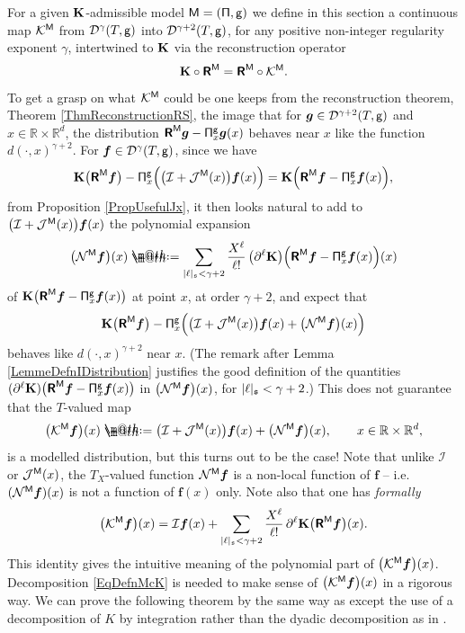 \documentclass[10pt, reqno]{amsart}
\makeatletter
\numberwithin{subsection}{section}
\numberwithin{subsubsection}{subsection}
\numberwithin{equation}{section} %
\theoremstyle{mystyle}
\theoremstyle{mystyle2}
\theoremstyle{mystyle3}
\newcommand{\bsf}{\boldsymbol{f}}
\newcommand{\bsg}{\boldsymbol{g}}
\newcommand\bbR{\mathbb{R}}
\newcommand{\mcD}{\mathcal{D}}
\newcommand{\mcI}{\mathcal{I}}
\newcommand{\mcJ}{\mathcal{J}}
\newcommand{\mcK}{\mathcal{K}}
\newcommand{\mcN}{\mathcal{N}}
\newcommand*{\defeq}{\mathrel{\rlap{%
                     \raisebox{0.3ex}{$\m@th\cdot$}}%
                     \raisebox{-0.3ex}{$\m@th\cdot$}}%
                     =}
\makeatother
\begin{document}
For a given ${\bf K}$-admissible model ${\sf M}=({\sf\Pi},{\sf g})$ we define in this section a continuous map $\mcK^{\sf M}$ from $\mcD^\gamma(T,\sf g)$ into $\mcD^{\gamma+2}(T,\sf g)$, for any positive non-integer regularity exponent $\gamma$, intertwined to ${\bf K}$ via the reconstruction operator
\begin{align} \label{eq KR=RK}
{\bf K}\circ\textbf{\textsf{R}}^{\sf M} = \textbf{\textsf{R}}^{\sf M}\circ\mcK^{\sf M}.
\end{align}
To get a grasp on what $\mcK^{\sf M}$ could be one keeps from the reconstruction theorem, Theorem \ref{ThmReconstructionRS}, the image that for $\bsg\in\mcD^{\gamma+2}(T,\sf g)$ and $x\in\bbR\times\bbR^d$, the distribution $\textbf{\textsf{R}}^{\sf M}\bsg - {\sf \Pi}_x^{\sf g}\bsg(x)$ behaves near $x$ like the function $d(\cdot,x)^{\gamma+2}$. For $\bsf\in\mcD^\gamma(T,\sf g)$, since we have
$$
{\bf K}\big(\textbf{\textsf{R}}^{\sf M}\bsf\big) - {\sf\Pi}_x^{\sf g}\Big(\big(\mcI+\mcJ^{\sf M}(x)\big)\bsf(x)\Big) = {\bf K}\Big(\textbf{\textsf{R}}^{\sf M}\bsf - {\sf\Pi}_x^{\sf g}\bsf(x)\Big),
$$
from Proposition \ref{PropUsefulJx}, it then looks natural to add to $\big(\mcI+\mcJ^{\sf M}(x)\big)\bsf(x)$ the polynomial expansion 
$$
\big(\mcN^{\sf M}\bsf\big)(x) \defeq  \sum_{\vert\ell\vert_{\frak{s}} < \gamma+2} \frac{X^\ell}{\ell!}\,\big(\partial^\ell{\bf K}\big)\Big(\textbf{\textsf{R}}^{\sf M}\bsf - {\sf\Pi}_x^{\sf g}\bsf(x)\Big)(x)
$$ 
of ${\bf K}\big(\textbf{\textsf{R}}^{\sf M}\bsf - {\sf\Pi}_x^{\sf g}\bsf(x)\big)$ at point $x$, at order $\gamma+2$, and expect that 
$$
{\bf K}\big(\textbf{\textsf{R}}^{\sf M}\bsf\big) - {\sf\Pi}_x^{\sf g}\Big(\big(\mcI+\mcJ^{\sf M}(x)\big)\bsf(x) + \big(\mcN^{\sf M}\bsf\big)(x)\Big)
$$
behaves like $d(\cdot,x)^{\gamma+2}$ near $x$. (The remark after Lemma \ref{LemmeDefnIDistribution} justifies the good definition of the quantities $(\partial^\ell{\bf K})\big(\textbf{\textsf{R}}^{\sf M}\bsf - {\sf\Pi}_x^{\sf g}\bsf(x)\big)$ in $\big(\mcN^{\sf M}\bsf\big)(x)$, for $\vert\ell\vert_{\frak{s}}<\gamma+2$.) This does not guarantee that the $T$-valued map 
\begin{equation} \label{EqDefnMcK}
\big(\mcK^{\sf M}\bsf\big)(x) \defeq  \big(\mcI+\mcJ^{\sf M}(x)\big)\bsf(x) + \big(\mcN^{\sf M}\bsf\big)(x),\qquad x\in\bbR\times\bbR^d,
\end{equation}
is a modelled distribution, but this turns out to be the case! Note that unlike $\mcI$ or $\mcJ^{\sf M}(x)$, the $T_X$-valued function $\mcN^{\sf M}\bsf$ is a non-local function of $\bsf$ -- i.e. $(\mcN^{\sf M}\bsf)(x)$ is not a function of $\bsf(x)$ only. Note also that one has \emph{formally}
$$
\big(\mcK^{\sf M}\bsf\big)(x) = \mcI\bsf(x) + \sum_{\vert\ell\vert_{\frak{s}} < \gamma+2} \frac{X^\ell}{\ell!}\,\partial^\ell{\bf K}\big(\textbf{\textsf{R}}^{\sf M}\bsf\big)(x).
$$
This identity gives the intuitive meaning of the polynomial part of $\big(\mcK^{\sf M}\bsf\big)(x)$. Decomposition \eqref{EqDefnMcK} is needed to make sense of $\big(\mcK^{\sf M}\bsf\big)(x)$ in a rigorous way. We can prove the following theorem by the same way as \cite[Theorem 5.12]{Hai14} except the use of a decomposition of $K$ by integration rather than the dyadic decomposition as in \cite{Hai14}.
\end{document}
